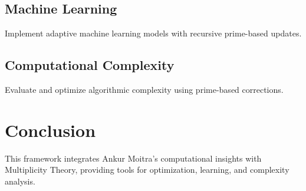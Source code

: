 \documentclass{article}
\theoremstyle{plain}
\begin{document}
\subsection{Machine Learning}
Implement adaptive machine learning models with recursive prime-based updates.

\subsection{Computational Complexity}
Evaluate and optimize algorithmic complexity using prime-based corrections.

\section{Conclusion}
This framework integrates Ankur Moitra’s computational insights with Multiplicity Theory, providing tools for optimization, learning, and complexity analysis.
\nocite{*}


\end{document}
